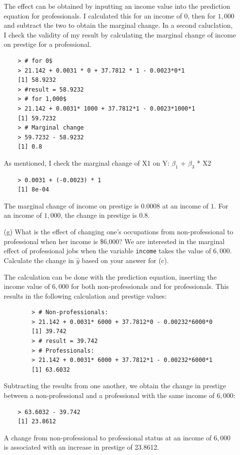 \documentclass[12pt,letterpaper]{article}
\begin{document}
\begin{enumerate}
	\vspace{.5cm}
	
	The effect can be obtained by inputting an income value into the prediction equation for professionals. I calculated this for an income of $0$, then for $1,000$ and subtract the two to obtain the marginal change. In a second caluclation, I check the validity of my result by calculating the marginal change of income on prestige for a professional. 
	
\begin{verbatim}
	> # for 0$
	> 21.142 + 0.0031 * 0 + 37.7812 * 1 - 0.0023*0*1
	[1] 58.9232
	> #result = 58.9232
	> # for 1,000$
	> 21.142 + 0.0031* 1000 + 37.7812*1 - 0.0023*1000*1
	[1] 59.7232
	> # Marginal change
	> 59.7232 - 58.9232
	[1] 0.8
\end{verbatim}
As mentioned, I check the marginal change of X1 on Y: $\beta_1$ + $\beta_3$ * X2
\begin{verbatim}
	> 0.0031 + (-0.0023) * 1
	[1] 8e-04
\end{verbatim}

	The marginal change of income on prestige is 0.0008 at an income of $1$. For an income of $1,000$, the change in prestige is 0.8. 
	\vspace{.5cm}
	\item [(g)]
	What is the effect of changing one's occupations from non-professional to professional when her income is \$6,000? We are interested in the marginal effect of professional jobs when the variable \texttt{income} takes the value of $6,000$. Calculate the change in $\hat{y}$ based on your answer for (c).
	\vspace{.5cm}
	
	The calculation can be done with the prediction equation, inserting the income value of $6,000$ for both non-professionals and for professionals. This results in the following calculation and prestige values:
	
	\begin{verbatim}
		> # Non-professionals:
		> 21.142 + 0.0031* 6000 + 37.7812*0 - 0.00232*6000*0
		[1] 39.742
		> # result = 39.742
		> # Professionals:
		> 21.142 + 0.0031* 6000 + 37.7812*1 - 0.00232*6000*1
		[1] 63.6032
	\end{verbatim}
	Subtracting the results from one another, we obtain the change in prestige between a non-professional and a professional with the same income of $6,000$:
	
\begin{verbatim}
	> 63.6032 - 39.742
	[1] 23.8612
\end{verbatim}

A change from non-professional to professional status at an income of $6,000$ is associated with an increase in prestige of 23.8612.
	
\end{enumerate}
\end{document}
